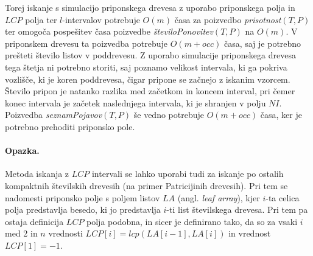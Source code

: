 Torej iskanje s simulacijo priponskega drevesa z uporabo priponskega polja in $LCP$ polja ter $l$-intervalov potrebuje $O(m)$ časa za poizvedbo \textit{prisotnost}$(T,P)$ ter omogoča pospešitev časa poizvedbe \textit{številoPonovitev}$(T,P)$ na $O(m)$. V priponskem drevesu ta poizvedba potrebuje $O(m+occ)$ časa, saj je potrebno prešteti število listov v poddrevesu. Z uporabo simulacije priponskega drevesa tega štetja ni potrebno storiti, saj poznamo velikost intervala, ki ga pokriva vozlišče, ki je koren poddrevesa, čigar pripone se začnejo z iskanim vzorcem. Število pripon je natanko razlika med začetkom in koncem interval, pri čemer konec intervala je začetek naslednjega intervala, ki je shranjen v polju $NI$. Poizvedba \textit{seznamPojavov}$(T,P)$ še vedno potrebuje $O(m+occ)$ časa, ker je potrebno prehoditi priponsko pole.

\paragraph{Opazka.}
Metoda iskanja z $LCP$ intervali se lahko uporabi tudi za iskanje po ostalih kompaktnih številskih drevesih (na primer Patricijinih drevesih). Pri tem se nadomesti priponsko polje s poljem listov $LA$ (angl. \textit{leaf array}), kjer $i$-ta celica polja predstavlja besedo, ki jo predstavlja $i$-ti list številskega drevesa. Pri tem pa ostaja definicija $LCP$ polja podobna, in sicer je definirano tako, da so za vsaki $i$ med 2 in $n$ vrednosti $LCP[i]=lcp(LA[i-1],LA[i])$ in vrednost $LCP[1]=-1$.
